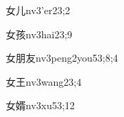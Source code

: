 \begin{verbete}{女儿}{nv3'er2}{3;2}
\end{verbete}

\begin{verbete}{女孩}{nv3hai2}{3;9}
\end{verbete}

\begin{verbete}{女朋友}{nv3peng2you5}{3;8;4}
\end{verbete}

\begin{verbete}{女王}{nv3wang2}{3;4}
\end{verbete}

\begin{verbete}{女婿}{nv3xu5}{3;12}
\end{verbete}

